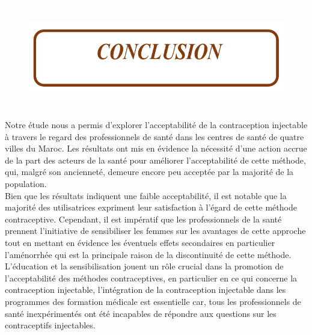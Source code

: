 \pagebreak

\begin{itemize}
  \item[\textcolor{white}{$\Box$}] 
\end{itemize}


\vspace{7cm}

\begin{figure}[H]
  \includegraphics{Images/conclusion.png}
\end{figure}

\section*{}



\pagebreak


\noindent Notre étude nous a permis d’explorer l’acceptabilité de la contraception injectable à travers le regard des professionnels de santé dans les centres de santé de quatre villes du Maroc. Les résultats ont mis en évidence la nécessité d'une action accrue de la part des acteurs de la santé pour améliorer l'acceptabilité de cette méthode, qui, malgré son ancienneté, demeure encore peu acceptée par la majorité de la population.\\

\noindent Bien que les résultats indiquent une faible acceptabilité, il est notable que la majorité des utilisatrices expriment leur satisfaction à l'égard de cette méthode contraceptive. Cependant, il est impératif que les professionnels de la santé prennent l’initiative de sensibiliser les femmes sur les avantages de cette approche tout en mettant en évidence les éventuels effets secondaires en particulier l’aménorrhée qui est la principale raison de la discontinuité de cette méthode. \\

\noindent L'éducation et la sensibilisation jouent un rôle crucial dans la promotion de l'acceptabilité des méthodes contraceptives, en particulier en ce qui concerne la contraception injectable, l'intégration de la contraception injectable dans les programmes des formation médicale est essentielle car, tous les professionnels de santé inexpérimentés ont été incapables de répondre aux questions sur les contraceptifs injectables.\\ 

